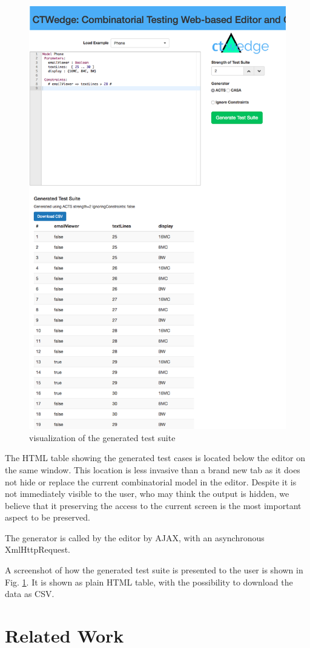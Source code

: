 \begin{tikzborder}{\cite{Gargantini16:validation}}
\begin{tikzborder}{\cite{gargantini_combinatorial_2017}}
\begin{tikzborder}{\cite{gargantini_combinatorial_2017}}
\begin{tikzborder}{\cite{garn2019}}
\begin{tikzborder}{\cite{arcaini2019achieving}}
\begin{figure}[hbt!]
	\centering
	\includegraphics[width=.5\columnwidth,trim={0 0 7cm 0},clip]{images/generatedTable.png}
	\caption{\ctwedge visualization of the generated test suite}\label{fig:generated}
\end{figure}

\begin{tikzborder}{}
The HTML table showing the generated test cases is located below the editor on the same window. This location is less invasive than a brand new tab as it does not hide or replace the current combinatorial model in the editor. Despite it is not immediately visible to the user, who may think the output is hidden, we believe that it preserving the access to the current screen is the most important aspect to be preserved.

The generator is called by the editor by AJAX, with an asynchronous XmlHttpRequest.

A screenshot of how the generated test suite is presented to the user is shown in Fig. \ref{fig:generated}. 
It is shown as plain HTML table, with the possibility to download the data as CSV. 
\end{tikzborder}

\section{Related Work}\label{sec:related2}


\end{tikzborder}
\end{tikzborder}
\end{tikzborder}
\end{tikzborder}
\end{tikzborder}
